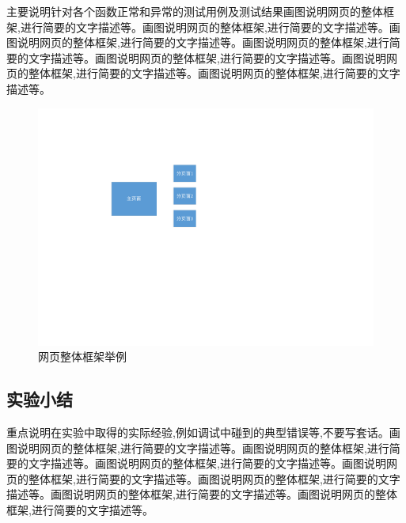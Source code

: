 \documentclass[supercite]{Experimental_Report}
\theoremstyle{definition}
\begin{document}
主要说明针对各个函数正常和异常的测试用例及测试结果画图说明网页的整体框架,进行简要的文字描述等。画图说明网页的整体框架,进行简要的文字描述等。画图说明网页的整体框架,进行简要的文字描述等。画图说明网页的整体框架,进行简要的文字描述等。画图说明网页的整体框架,进行简要的文字描述等。画图说明网页的整体框架,进行简要的文字描述等。画图说明网页的整体框架,进行简要的文字描述等。

\begin{figure}[htb] %
	\begin{center}
		\includegraphics[scale=0.80]{images/1-1.pdf}
		\caption{网页整体框架举例}
		\label{fig1-1}
	\end{center}
\end{figure}

\subsection{实验小结}

重点说明在实验中取得的实际经验,例如调试中碰到的典型错误等,不要写套话。画图说明网页的整体框架,进行简要的文字描述等。画图说明网页的整体框架,进行简要的文字描述等。画图说明网页的整体框架,进行简要的文字描述等。画图说明网页的整体框架,进行简要的文字描述等。画图说明网页的整体框架,进行简要的文字描述等。画图说明网页的整体框架,进行简要的文字描述等。画图说明网页的整体框架,进行简要的文字描述等。
\end{document}
